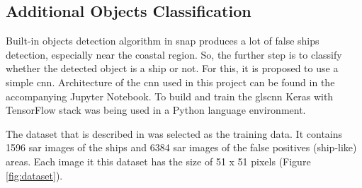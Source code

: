 
\subsection{Additional Objects Classification}

Built-in objects detection algorithm in \gls{snap} produces a lot of false ships detection, especially near the coastal region. So, the further step is to classify whether the detected object is a ship or not. For this, it is proposed to use a simple \gls{cnn}. Architecture of the \gls{cnn} used in this project can be found in the accompanying Jupyter Notebook. To build and train the gls{cnn} Keras with TensorFlow stack was being used in a Python language environment.

The dataset that is described in \cite{data} was selected as the training data. It contains 1596 \gls{sar} images of the ships and 6384 \gls{sar} images of the false positives (ship-like) areas. Each image it this dataset has the size of 51 x 51 pixels (Figure \ref{fig:dataset}).


